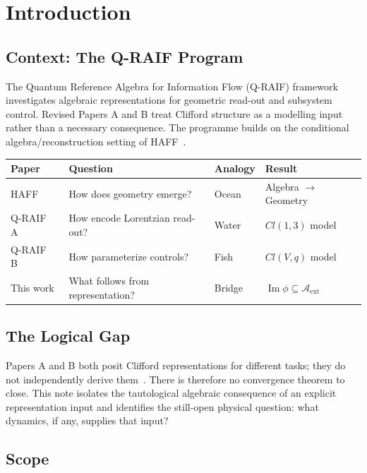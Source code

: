 \documentclass[12pt,a4paper,openany]{book}
\begin{document}
\section{Introduction}
\label{Q-C-sec:intro}

\subsection{Context: The Q-RAIF Program}

The Quantum Reference Algebra for Information Flow (Q-RAIF) framework investigates algebraic representations for geometric read-out and subsystem control.  Revised Papers A and B treat Clifford structure as a modelling input rather than a necessary consequence.  The programme builds on the conditional algebra/reconstruction setting of HAFF~\cite{Liu2026PaperA,Liu2026PaperB}.

\begin{center}
\small
\begin{tabular}{@{}llll@{}}
\toprule
\textbf{Paper} & \textbf{Question} & \textbf{Analogy} & \textbf{Result} \\
\midrule
HAFF~\cite{Liu2026PaperA} & How does geometry emerge? & Ocean & Algebra $\to$ Geometry \\
Q-RAIF A~\cite{Liu2026QRAIF_A} & How encode Lorentzian read-out? & Water & $Cl(1,3)$ model \\
Q-RAIF B~\cite{Liu2026QRAIF_B} & How parameterize controls? & Fish & $Cl(V,q)$ model \\
This work & What follows from representation? & Bridge & $\operatorname{Im}\phi\subseteq\mathcal A_{\mathrm{ext}}$ \\
\bottomrule
\end{tabular}
\end{center}

\subsection{The Logical Gap}

Papers A and B both posit Clifford representations for different tasks; they do not independently derive them~\cite{Liu2026QRAIF_A,Liu2026QRAIF_B}.  There is therefore no convergence theorem to close.  This note isolates the tautological algebraic consequence of an explicit representation input and identifies the still-open physical question: what dynamics, if any, supplies that input?

\subsection{Scope}
\end{document}
